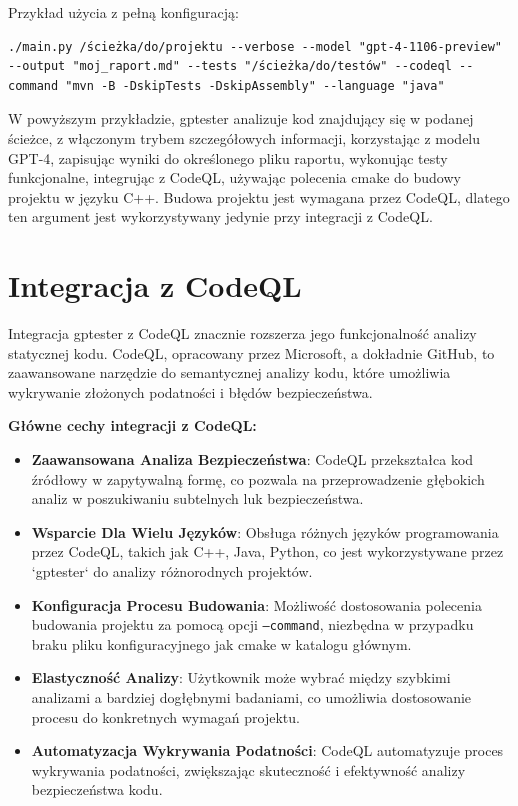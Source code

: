 Przykład użycia z pełną konfiguracją:

\begin{listing}
    \begin{verbatim}
./main.py /ścieżka/do/projektu --verbose --model "gpt-4-1106-preview" --output "moj_raport.md" --tests "/ścieżka/do/testów" --codeql --command "mvn -B -DskipTests -DskipAssembly" --language "java"
\end{verbatim}
\end{listing}

W powyższym przykładzie, gptester analizuje kod znajdujący się w podanej ścieżce, z włączonym trybem szczegółowych informacji, korzystając z modelu GPT-4, zapisując wyniki do określonego pliku raportu, wykonując testy funkcjonalne, integrując z CodeQL, używając polecenia cmake do budowy projektu w języku C++. Budowa projektu jest wymagana przez CodeQL, dlatego ten argument jest wykorzystywany jedynie przy integracji z CodeQL.

\section{Integracja z CodeQL}

Integracja gptester z CodeQL znacznie rozszerza jego funkcjonalność analizy statycznej kodu. CodeQL, opracowany przez Microsoft, a dokładnie GitHub, to zaawansowane narzędzie do semantycznej analizy kodu, które umożliwia wykrywanie złożonych podatności i błędów bezpieczeństwa.

\textbf{Główne cechy integracji z CodeQL:}
\begin{itemize}
    \item \textbf{Zaawansowana Analiza Bezpieczeństwa}: CodeQL przekształca kod źródłowy w zapytywalną formę, co pozwala na przeprowadzenie głębokich analiz w poszukiwaniu subtelnych luk bezpieczeństwa.
    \item \textbf{Wsparcie Dla Wielu Języków}: Obsługa różnych języków programowania przez CodeQL, takich jak C++, Java, Python, co jest wykorzystywane przez `gptester` do analizy różnorodnych projektów.
    \item \textbf{Konfiguracja Procesu Budowania}: Możliwość dostosowania polecenia budowania projektu za pomocą opcji \texttt{--command}, niezbędna w przypadku braku pliku konfiguracyjnego jak cmake w katalogu głównym.
    \item \textbf{Elastyczność Analizy}: Użytkownik może wybrać między szybkimi analizami a bardziej dogłębnymi badaniami, co umożliwia dostosowanie procesu do konkretnych wymagań projektu.
    \item \textbf{Automatyzacja Wykrywania Podatności}: CodeQL automatyzuje proces wykrywania podatności, zwiększając skuteczność i efektywność analizy bezpieczeństwa kodu.
\end{itemize}

